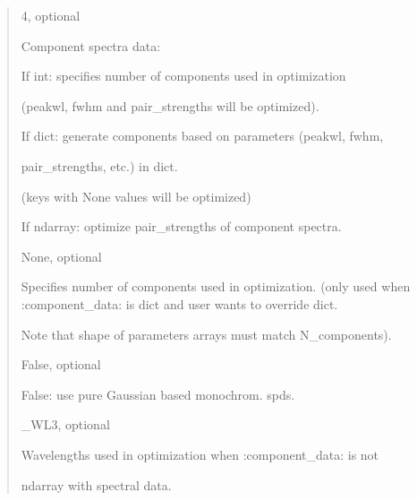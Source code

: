 \documentclass[letterpaper,10pt,english]{sphinxmanual}
\begin{document}
\begin{fulllineitems}
\begin{description}
\begin{quote}
\begin{description}
\item[{component\_data}] \leavevmode
\begin{DUlineblock}{0em}
\item[] 4, optional
\item[] Component spectra data: 
\item[] If int: specifies number of components used in optimization 
\item[]
\begin{DUlineblock}{\DUlineblockindent}
\item[] (peakwl, fwhm and pair\_strengths will be optimized).
\end{DUlineblock}
\item[] If dict: generate components based on parameters (peakwl, fwhm, 
\item[]
\begin{DUlineblock}{\DUlineblockindent}
\item[]
\begin{DUlineblock}{\DUlineblockindent}
\item[] pair\_strengths, etc.) in dict. 
\end{DUlineblock}
\item[] (keys with None values will be optimized)
\end{DUlineblock}
\item[] If ndarray: optimize pair\_strengths of component spectra.
\end{DUlineblock}

\item[{N\_components}] \leavevmode
\begin{DUlineblock}{0em}
\item[] None, optional
\item[] Specifies number of components used in optimization. (only used 
when :component\_data: is dict and user wants to override dict. 
\item[] Note that shape of parameters arrays must match N\_components).
\end{DUlineblock}

\item[{allow\_butterworth\_mono\_spds}] \leavevmode
\begin{DUlineblock}{0em}
\item[] False, optional
\item[] False: use pure Gaussian based monochrom. spds.
\end{DUlineblock}

\item[{wl}] \leavevmode
\begin{DUlineblock}{0em}
\item[] \_WL3, optional
\item[] Wavelengths used in optimization when :component\_data: is not 
\item[] ndarray with spectral data.
\end{DUlineblock}


\end{description}
\end{quote}
\end{description}
\end{fulllineitems}
\end{document}

